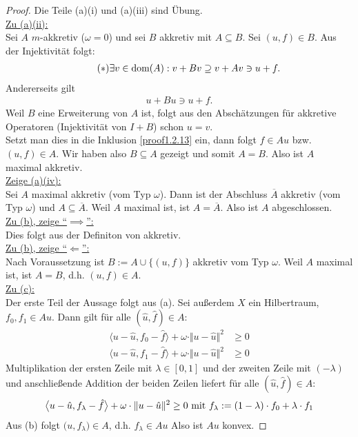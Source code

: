 \begin{proof}
Die Teile (a)(i) und (a)(iii) sind Übung.\\

\underline{Zu (a)(ii):}\\
Sei $A$ $m$-akkretiv ($\omega=0$) und sei $B$ akkretiv mit $A\subseteq B$. Sei $(u,f)\in B$. Aus der Injektivität folgt:
\begin{align}\label{proof1.2.13}\tag{$\ast$}
\exists v\in\dom(A):v+Bv\supseteq v+Av\ni u+f.
\end{align}
Andererseits gilt
\begin{align*}
u+Bu\ni u+f.
\end{align*}
Weil $B$ eine Erweiterung von $A$ ist, folgt aus den Abschätzungen für akkretive Operatoren (Injektivität von $I+B$) schon $u=v$.\\
Setzt man dies in die Inklusion \eqref{proof1.2.13} ein, dann folgt $f\in Au$ bzw. $(u,f)\in A$. Wir haben also $B\subseteq A$ gezeigt und somit $A=B$. Also ist $A$ maximal akkretiv.\\

\underline{Zeige (a)(iv):}\\
Sei $A$ maximal akkretiv (vom Typ $\omega$). Dann ist der Abschluss $\overline{A}$ akkretiv (vom Typ $\omega$) und $A\subseteq\overline{A}$. Weil $A$ maximal ist, ist $A=\overline{A}$. Also ist $A$ abgeschlossen.\\

\underline{Zu (b), zeige ``$\implies$'':}\\
Dies folgt aus der Definiton von akkretiv.\\

\underline{Zu (b), zeige ``$\Longleftarrow$'':}\\
Nach Voraussetzung ist $B:=A\cup\big\lbrace(u,f)\big\rbrace$ akkretiv vom Typ $\omega$. Weil $A$ maximal ist, ist $A=B$, d.h. $(u,f)\in A$.\\

\underline{Zu (c):}\\
Der erste Teil der Aussage folgt aus (a). Sei außerdem $X$ ein Hilbertraum, $f_0,f_1\in Au$. Dann gilt für alle $(\hat{u},\hat{f})\in A$:
\begin{align*}
\big\langle u-\hat{u},f_0-\hat{f}\big\rangle+\omega\cdot\Vert u-\hat{u}\Vert^2&\geq0\\
\big\langle u-\hat{u},f_1-\hat{f}\big\rangle+\omega\cdot\Vert u-\hat{u}\Vert^2&\geq0
\end{align*}
Multiplikation der ersten Zeile mit $\lambda\in[0,1]$ und der zweiten Zeile mit $(-\lambda)$ und anschließende Addition der beiden Zeilen liefert für alle $(\hat{u},\hat{f})\in A:$
\begin{align*}
\big\langle u-\hat{u},f_\lambda-\hat{f}\big\rangle +\omega\cdot\Vert u-\hat{u}\Vert^2\geq0\mit f_\lambda:=(1-\lambda)\cdot f_0+\lambda\cdot f_1
\end{align*}
Aus (b) folgt $\big(u,f_{\lambda}\big)\in A$, d.h. $f_\lambda\in Au$ Also ist $Au$ konvex.
\end{proof}

